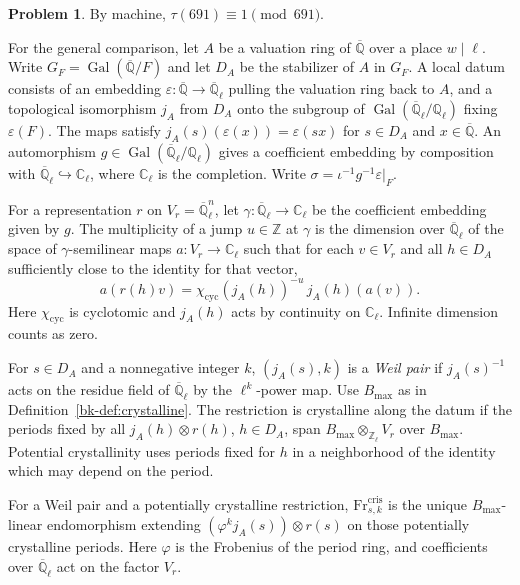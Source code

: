 \documentclass[reqno]{amsart}
\theoremstyle{definition}
\newtheorem{problem}{Problem}[section]
\newcommand{\Q}{\mathbb Q}
\newcommand{\Z}{\mathbb Z}
\newcommand{\C}{\mathbb C}
\newcommand{\Qlbar}{\overline{\Q}_\ell}
\newcommand{\Fr}{\mathrm{Fr}}
\newcommand{\Gal}{\operatorname{Gal}}
\begin{document}
\begin{problem}\label{pr:691}
By machine, \(\tau(691)\equiv1\pmod{691}\).
\end{problem}

For the general comparison, let \(A\) be a valuation ring of \(\overline{\Q}\) over a place \(w\mid\ell\).  Write \(G_F=\Gal(\overline{\Q}/F)\) and let \(D_A\) be the stabilizer of \(A\) in \(G_F\).  A local datum consists of an embedding \(\varepsilon:\overline{\Q}\to\Qlbar\) pulling the valuation ring back to \(A\), and a topological isomorphism \(j_A\) from \(D_A\) onto the subgroup of \(\Gal(\Qlbar/\Q_\ell)\) fixing \(\varepsilon(F)\).  The maps satisfy \(j_A(s)(\varepsilon(x))=\varepsilon(sx)\) for \(s\in D_A\) and \(x\in\overline{\Q}\).  An automorphism \(g\in\Gal(\Qlbar/\Q_\ell)\) gives a coefficient embedding by composition with \(\Qlbar\hookrightarrow\C_\ell\), where \(\C_\ell\) is the completion.  Write \(\sigma=\iota^{-1}g^{-1}\varepsilon|_F\).

For a representation \(r\) on \(V_r=\Qlbar^n\), let \(\gamma:\Qlbar\to\C_\ell\) be the coefficient embedding given by \(g\).  The multiplicity of a jump \(u\in\Z\) at \(\gamma\) is the dimension over \(\Qlbar\) of the space of \(\gamma\)-semilinear maps \(a:V_r\to\C_\ell\) such that for each \(v\in V_r\) and all \(h\in D_A\) sufficiently close to the identity for that vector,
\[
 a(r(h)v)=\chi_{\mathrm{cyc}}(j_A(h))^{-u}\,j_A(h)(a(v)).
\]
Here \(\chi_{\mathrm{cyc}}\) is cyclotomic and \(j_A(h)\) acts by continuity on \(\C_\ell\).  Infinite dimension counts as zero.

For \(s\in D_A\) and a nonnegative integer \(k\), \((j_A(s),k)\) is a \emph{Weil pair} if \(j_A(s)^{-1}\) acts on the residue field of \(\Qlbar\) by the \(\ell^k\)-power map.  Use \(B_{\max}\) as in Definition~\ref{bk-def:crystalline}.  The restriction is crystalline along the datum if the periods fixed by all \(j_A(h)\otimes r(h)\), \(h\in D_A\), span \(B_{\max}\otimes_{\Z_\ell}V_r\) over \(B_{\max}\).  Potential crystallinity uses periods fixed for \(h\) in a neighborhood of the identity which may depend on the period.

For a Weil pair and a potentially crystalline restriction, \(\Fr^{\mathrm{cris}}_{s,k}\) is the unique \(B_{\max}\)-linear endomorphism extending \((\varphi^k j_A(s))\otimes r(s)\) on those potentially crystalline periods.  Here \(\varphi\) is the Frobenius of the period ring, and coefficients over \(\Qlbar\) act on the factor \(V_r\).
\end{document}
